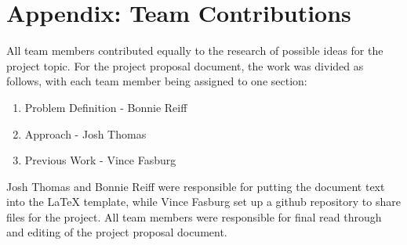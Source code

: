 \documentclass[pagenumbers]{ieee}
\begin{document}
\appendix 


\section{Appendix: Team Contributions}

All team members contributed equally to the research of possible ideas for the project topic. For the project proposal document, the work was divided as follows, with each team member being assigned to one section:

\begin{enumerate}
\item Problem Definition - Bonnie Reiff
\item Approach - Josh Thomas
\item Previous Work - Vince Fasburg
\end{enumerate}

Josh Thomas and Bonnie Reiff were responsible for putting the document text into the LaTeX template, while Vince Fasburg set up a github repository to share files for the project. All team members were responsible for final read through and editing of the project proposal document.




\end{document}
